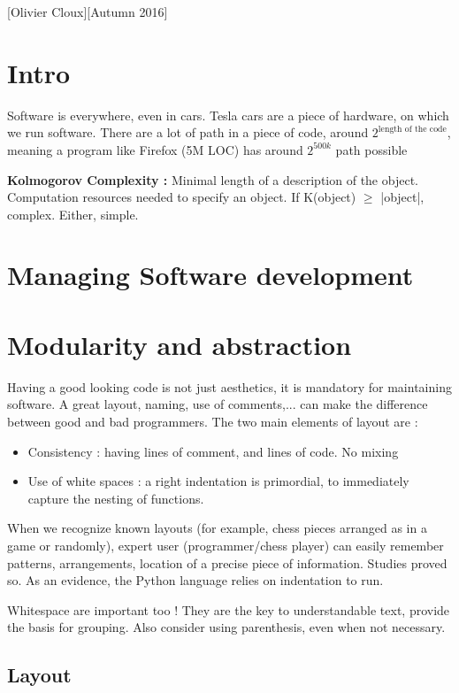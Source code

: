 \documentclass[12pt,a4paper]{article}
\begin{document}
\lstset{language=Java}
[Olivier Cloux][Autumn 2016]
\newpage
\tableofcontents
{}
\section{Intro}
Software is everywhere, even in cars. Tesla cars are a piece of hardware, on which we run software. There are a lot of path in a piece of code, around $2^{\text{length of the code}}$, meaning a program like Firefox (5M LOC) has around $2^{500k}$ path possible

\textbf{Kolmogorov Complexity :} Minimal length of a description of the object. Computation resources needed to specify an object. If K(object) $\geq$ |object|, complex. Either, simple.

\section{Managing Software development}

\section{Modularity and abstraction}
Having a good looking code is not just aesthetics, it is mandatory for maintaining software. A great layout, naming, use of comments,... can make the difference between good and bad programmers. The two main elements of layout are : 
\begin{itemize}
    \item Consistency : having lines of comment, and lines of code. No mixing
    \item Use of white spaces : a right indentation is primordial, to immediately capture the nesting of functions.
\end{itemize}
When we recognize known layouts (for example, chess pieces arranged as in a game or randomly), expert user (programmer/chess player) can easily remember patterns, arrangements, location of a precise piece of information. Studies proved so. As an evidence, the Python language relies on indentation to run. 

Whitespace are important too ! They are the key to understandable text, provide the basis for grouping. Also consider using parenthesis, even when not necessary.

\subsection{Layout}
\end{document}
